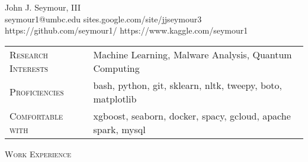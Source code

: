 \pagestyle{headings}
\newcommand{\tab}{\hspace*{3em}}
\newcommand{\atab}{\hangindent=3em \hangafter=0}
\newcommand{\btab}{\hangindent=6em \hangafter=0}
\newcommand{\ctab}{\hangindent=9em \hangafter=0}
\newcommand{\untab}{\hspace*{-3em}}

\newenvironment{my_list}
{\begin{itemize}
    \vspace{-4mm}
    \setlength{\itemsep}{0pt}
    \setlength{\itemindent}{6em}
    \setlength{\parskip}{0pt}
    \setlength{\parsep}{0pt}}
{\end{itemize}}

\oddsidemargin  -0.4in
\textwidth      7in
\topmargin  -0.5in
\headheight 0.0in
\headsep    0.0in
\textheight 11.0in


\centering
\LARGE \untab John J. Seymour, III\\
\normalsize
\medskip
seymour1@umbc.edu \tab \tab sites.google.com/site/jjseymour3\\
https://github.com/seymour1/ \tab https://www.kaggle.com/seymour1
\medskip
\hline
\bigskip

\begin{tabular}{ l l }
\textsc{Research Interests} & Machine Learning, Malware Analysis, Quantum Computing\\
\textsc{Proficiencies} & bash, python, git, sklearn, nltk, tweepy, boto, matplotlib\\
\textsc{Comfortable with} & xgboost, seaborn, docker, spacy, gcloud, apache spark, mysql\\
\end{tabular}

\raggedright
\bigskip
\textsc{Work Experience}

